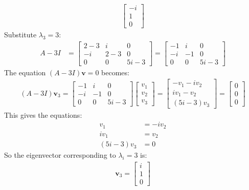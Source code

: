 \begin{enumerate}
\begin{align}
\begin{bmatrix}
    -i \\
    1 \\
    0
    \end{bmatrix}
\end{align}
Substitute $\lambda_3 = 3$:
\begin{align*}
    A - 3I &= \begin{bmatrix}
    2-3 & i & 0 \\
    -i & 2-3 & 0 \\
    0 & 0 & 5i - 3
    \end{bmatrix} = \begin{bmatrix}
    -1 & i & 0 \\
    -i & -1 & 0 \\
    0 & 0 & 5i-3
    \end{bmatrix}
\end{align*}
The equation $\displaystyle (A - 3I)\mathbf{v}=0$ becomes:
\begin{align*}
    (A - 3I)\mathbf{v}_3 = \begin{bmatrix}
    -1 & i & 0 \\
    -i & -1 & 0 \\
    0 & 0 & 5i - 3
    \end{bmatrix} \begin{bmatrix}
    v_1 \\
    v_2 \\
    v_3
    \end{bmatrix} = \begin{bmatrix}
    -v_1-iv_2 \\
    iv_1-v_2 \\
    (5i - 3)v_3
    \end{bmatrix} = \begin{bmatrix}
    0 \\
    0 \\
    0
    \end{bmatrix}
\end{align*}
This gives the equations:
\begin{align*}
    v_1 &= - iv_2 \\
    iv_1 &= v_2 \\
    (5i - 3)v_3 &= 0
\end{align*}
So the eigenvector corresponding to $\lambda_i=3$ is:
\begin{align}
    \mathbf{v}_3 = \begin{bmatrix}
    i \\
    1 \\
    0
    \end{bmatrix}

\end{align}
\end{enumerate}
